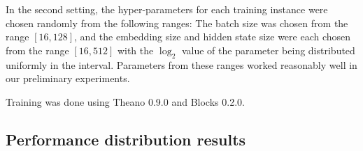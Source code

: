 \documentclass{article}
\newcommand{\asr}{\gls{psr}\xspace}
\newcommand{\cbtcn}{\gls{cbtcn}\xspace}
\newcommand{\ml}{\gls{ml}\xspace}
\begin{document}
\begin{appendices}
In the second setting, the hyper-parameters for each training instance were chosen randomly from the following ranges: The batch size was chosen from the range $[16,128]$, and the embedding size and hidden state size were each chosen from the range $[16,512]$ with the $\log_2$ value of the parameter being distributed uniformly in the interval. Parameters from these ranges worked reasonably well in our preliminary experiments.

Training was done using Theano 0.9.0 and Blocks 0.2.0.

\subsection{Performance distribution results}
\label{sec:perfDists}








\end{appendices}
\end{document}
